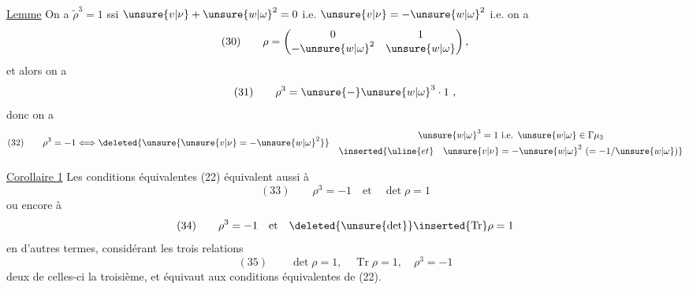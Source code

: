 \uline{Lemme} On a $\widetilde\rho^3=1$ ssi $\unsure{v|\nu}+\unsure{w|\omega}^2=0$ i.e. $\unsure{v|\nu}=-\unsure{w|\omega}^2$ i.e. on a
\[
(30)\qquad
\rho=\begin{pmatrix}0&1\\-\unsure{w|\omega}^2&\unsure{w|\omega}\end{pmatrix},
\]
et alors on a
\[
(31)\qquad \rho^3=\unsure{-}\unsure{w|\omega}^3\cdot1\ ,
\]
donc on a
\[
(32)\qquad
\rho^3=-1\Longleftrightarrow
\deleted{\unsure{\unsure{v|\nu}=-\unsure{w|\omega}^2}}\quad
\begin{gathered}
\unsure{w|\omega}^3=1\ \text{i.e. }\unsure{w|\omega}\in\Gamma\mu_3\\
\inserted{\uline{et}\quad \unsure{v|\nu}=-\unsure{w|\omega}^2\ (= -1/\unsure{w|\omega})}
\end{gathered}
\]



\uline{Corollaire 1} Les conditions équivalentes (22) équivalent aussi à
\[
(33)\qquad \rho^3=-1\quad\text{et}\quad\det\rho=1
\]
ou encore à
\[
(34)\qquad \rho^3=-1\quad\text{et}\quad\deleted{\unsure{\det}}\inserted{\operatorname{Tr}}\rho=1
\]
en d'autres termes, considérant les trois relations
\[
(35)\qquad \det\rho=1,\quad\operatorname{Tr}\rho=1,\quad\rho^3=-1
\]
 deux de celles-ci  la troisième, et équivaut aux conditions équivalentes de (22).




